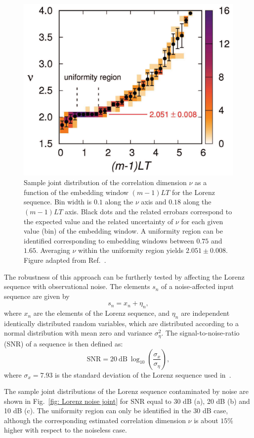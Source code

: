 \begin{figure}[!htbp]
    \centering
    \includegraphics[width=.6\linewidth]{images/joint_Lorenz.png}
    \caption{Sample joint distribution of the correlation dimension $\nu$ as a function of the
    embedding window $(m-1)LT$ for the Lorenz sequence. Bin width is $0.1$ along the $\nu$ axis and
    $0.18$ along the $(m-1)LT$ axis.
    Black dots and the related errobars correspond to the expected value and the related uncertainty of
    $\nu$ for each given value (bin) of the embedding window. A uniformity region can be identified
    corresponding to embedding windows between $0.75$ and $1.65$. Averaging $\nu$ within
    the uniformity region yields $2.051 \pm 0.008$.
    Figure adapted from Ref.~\cite{ref:perinelli2020chasing}.
    }\label{fig: Lorenz joint}
\end{figure}

The robustness of this approach can be furtherly tested by affecting the Lorenz sequence with
observational noise. The elements $s_n$ of a noise-affected input sequence are given by
\begin{equation}
    \label{eq: noise sequence}
    s_n=x_n+\eta_n,
\end{equation}
where $x_n$ are the elements of the Lorenz sequence, and $\eta_n$ are independent
identically distributed random variables, which are distributed according to a normal distribution
with mean zero and variance $\sigma_\eta^2$.
The signal-to-noise-ratio (SNR) of a sequence is then defined as:
\begin{equation}
    \label{eq: snr}
    \text{SNR}= 20~\text{dB}~\log_{10}\left(\frac{\sigma_x}{\sigma_\eta}\right),
\end{equation}
where $\sigma_x=7.93$ is the standard deviation of the Lorenz sequence used in~\cite{ref:perinelli2020chasing}.

The sample joint distributions of the Lorenz sequence contaminated by noise are shown in Fig.~\ref{fig: Lorenz noise joint}
for SNR equal to 30 dB (a), 20 dB (b) and 10 dB (c).
The uniformity region can only be identified in the 30 dB case, although the corresponding estimated
correlation dimension $\nu$ is about $15\%$ higher with respect to the noiseless case.

